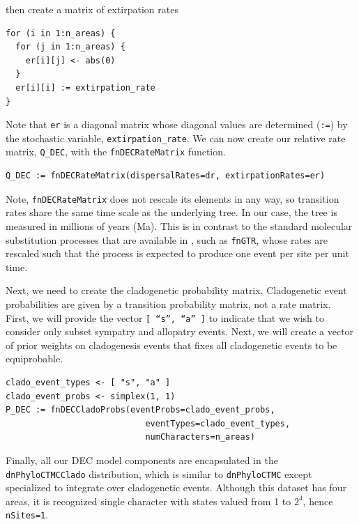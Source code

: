then create a matrix of extirpation rates

\begin{snugshade}
\begin{lstlisting}
for (i in 1:n_areas) {
  for (j in 1:n_areas) {
    er[i][j] <- abs(0)        
  }
  er[i][i] := extirpation_rate
}
\end{lstlisting}
\end{snugshade}

Note that {\tt er} is a diagonal matrix whose diagonal values are determined ({\tt :=}) by the stochastic variable, {\tt extirpation\_rate}.
We can now create our relative rate matrix, {\tt Q\_DEC}, with the {\tt fnDECRateMatrix} function.

\begin{snugshade}
\begin{lstlisting}
Q_DEC := fnDECRateMatrix(dispersalRates=dr, extirpationRates=er)
\end{lstlisting}
\end{snugshade}

Note, {\tt fnDECRateMatrix} does not rescale its elements in any way, so transition rates share the same time scale as the underlying tree.
In our case, the tree is measured in millions of years (Ma).
This is in contrast to the standard molecular substitution processes that are available in \RevBayes, such as {\tt fnGTR}, whose rates are rescaled such that the process is expected to produce one event per site per unit time.

Next, we need to create the cladogenetic probability matrix.
Cladogenetic event probabilities are given by a transition probability matrix, not a rate matrix.
First, we will provide the vector {\tt [ ``s'', ``a'' ]} to indicate that we wish to consider only subset sympatry and allopatry events.
Next, we will create a vector of prior weights on cladogenesis events that fixes all cladogenetic events to be equiprobable.

\begin{snugshade}
\begin{lstlisting}
clado_event_types <- [ "s", "a" ]
clado_event_probs <- simplex(1, 1)
P_DEC := fnDECCladoProbs(eventProbs=clado_event_probs,
                            eventTypes=clado_event_types,
                            numCharacters=n_areas)
\end{lstlisting}
\end{snugshade}

Finally, all our DEC model components are encapsulated in the {\tt dnPhyloCTMCClado} distribution, which is similar to {\tt dnPhyloCTMC} except specialized to integrate over cladogenetic events.
Although this dataset has four areas, it is recognized single character with states valued from 1 to $2^4$, hence {\tt nSites=1}.

